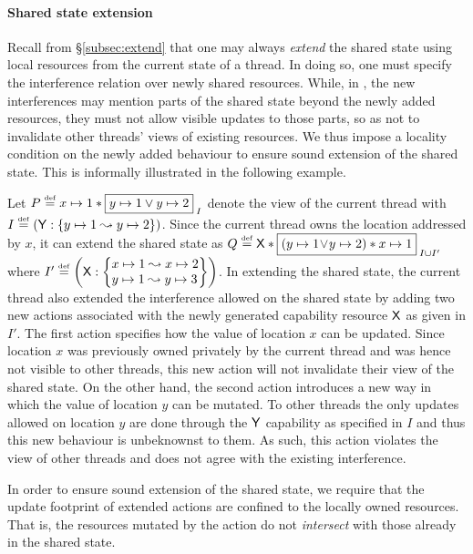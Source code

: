 \paragraph{Shared state extension}
Recall from \S\ref{subsec:extend} that one may always \emph{extend}
the shared state using local resources from the current state of a
thread. In doing so, one must specify the interference relation over
newly shared resources. While, in \colosl, the new interferences may
mention parts of the shared state beyond the newly added resources,
they must not allow visible updates to those parts, so as not to
invalidate other threads' views of existing resources. We thus impose
a locality condition on the newly added behaviour to ensure sound
extension of the shared state. This is informally illustrated in the
following example.
\begin{example}\label{ex:badExtension}
Let $P \eqdef \cell{x}{1} * \shared{\cell{y}{1} \lor \cell{y}{2}}{I}$ denote the view of the current thread with $I \mathrel{\stackrel{\smash{\scriptscriptstyle{\mathrm{def}}}}{=}} \left(\mathsf{Y}: \left\{y \mapsto 1 \mathrel{\leadsto} y \mapsto 2\right\} \right)$. Since the current thread owns the location addressed by $x$, it can extend the shared state as $Q \eqdef \token{X} * \shared{\left(\cell{y}{1} \!\lor\! \cell{y}{2} \right) * \cell{x}{1}}{I \cup I'}$ where 
$
	I' \eqdef 
		\left(
			\token{X}: 
			\left\{
			\begin{array}{@{}l@{}} 
				\cell{x}{1} \swap \cell{x}{2}\\
				\cell{y}{1} \swap \cell{y}{3}
			\end{array}
			\right\}
		 \right)
$.
In extending the shared state, the current thread also extended the interference allowed on the shared state by adding two new actions associated with the newly generated capability resource $\mathsf{X}$ as given in $I'$. The first action specifies how the value of location $x$ can be updated. Since location $x$ was previously owned privately by the current thread and was hence not visible to other threads, this new action will not invalidate their view of the shared state. On the other hand, the second action introduces a new way in which the value of location $y$ can be mutated. To other threads the only updates allowed on location $y$ are done through the $\mathsf{Y}$ capability as specified in $I$ and thus this new behaviour is unbeknownst to them. As such, this action violates the view of other threads and does not agree with the existing interference.
\end{example}
In order to ensure sound extension of the shared state, we require
that the update footprint of extended actions are confined to the
locally owned resources. That is, the resources mutated by the action
do not \emph{intersect} with those already in the shared state.



